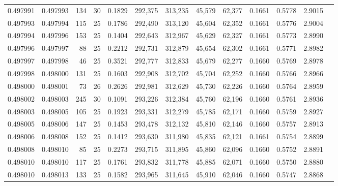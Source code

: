 \begin{tabular}{rrrrrrrrrrrrr}
0.497991 & 0.497993 & 134 &  30 &                                     0.1829 & 292,375 & 313,235 &  45,579 &  62,377 & 0.1661 & 0.5778 & 2.9015 \\
0.497993 & 0.497994 & 115 &  25 &                                     0.1786 & 292,490 & 313,120 &  45,604 &  62,352 & 0.1661 & 0.5776 & 2.9004 \\
0.497994 & 0.497996 & 153 &  25 &                                     0.1404 & 292,643 & 312,967 &  45,629 &  62,327 & 0.1661 & 0.5773 & 2.8990 \\
0.497996 & 0.497997 &  88 &  25 &                                     0.2212 & 292,731 & 312,879 &  45,654 &  62,302 & 0.1661 & 0.5771 & 2.8982 \\
0.497997 & 0.497998 &  46 &  25 &                                     0.3521 & 292,777 & 312,833 &  45,679 &  62,277 & 0.1660 & 0.5769 & 2.8978 \\
0.497998 & 0.498000 & 131 &  25 &                                     0.1603 & 292,908 & 312,702 &  45,704 &  62,252 & 0.1660 & 0.5766 & 2.8966 \\
0.498000 & 0.498001 &  73 &  26 &                                     0.2626 & 292,981 & 312,629 &  45,730 &  62,226 & 0.1660 & 0.5764 & 2.8959 \\
0.498002 & 0.498003 & 245 &  30 &                                     0.1091 & 293,226 & 312,384 &  45,760 &  62,196 & 0.1660 & 0.5761 & 2.8936 \\
0.498003 & 0.498005 & 105 &  25 &                                     0.1923 & 293,331 & 312,279 &  45,785 &  62,171 & 0.1660 & 0.5759 & 2.8927 \\
0.498005 & 0.498006 & 147 &  25 &                                     0.1453 & 293,478 & 312,132 &  45,810 &  62,146 & 0.1660 & 0.5757 & 2.8913 \\
0.498006 & 0.498008 & 152 &  25 &                                     0.1412 & 293,630 & 311,980 &  45,835 &  62,121 & 0.1661 & 0.5754 & 2.8899 \\
0.498008 & 0.498010 &  85 &  25 &                                     0.2273 & 293,715 & 311,895 &  45,860 &  62,096 & 0.1660 & 0.5752 & 2.8891 \\
0.498010 & 0.498010 & 117 &  25 &                                     0.1761 & 293,832 & 311,778 &  45,885 &  62,071 & 0.1660 & 0.5750 & 2.8880 \\
0.498010 & 0.498013 & 133 &  25 &                                     0.1582 & 293,965 & 311,645 &  45,910 &  62,046 & 0.1660 & 0.5747 & 2.8868 \\

\end{tabular}
